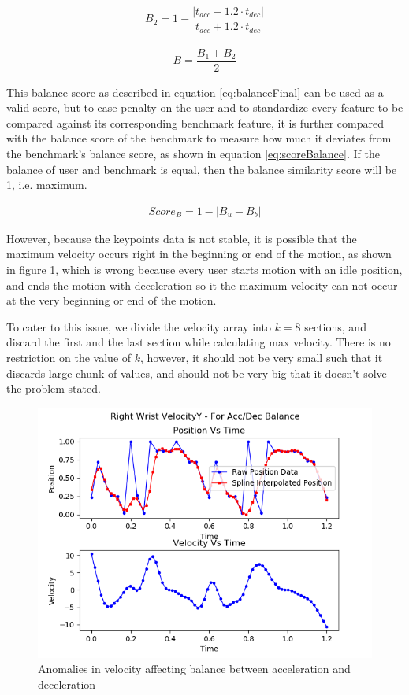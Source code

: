 \begin{gather} 
  B_2 = 1 - \dfrac{|t_{acc} - 1.2 \cdot t_{dec}|}{t_{acc} + 1.2 \cdot t_{dec}}
  \label{eq:balance2}
\end{gather}

\begin{gather} 
  B = \dfrac{B_1 + B_2}{2}
  \label{eq:balanceFinal}
\end{gather}

This balance score as described in equation \ref{eq:balanceFinal} can be used as a valid score, but to ease penalty on the user and to standardize every feature to be compared against its corresponding benchmark feature, it is further compared with the balance score of the benchmark to measure how much it deviates from the benchmark's balance score, as shown in equation \ref{eq:scoreBalance}. If the balance of user and benchmark is equal, then the balance similarity score will be 1, i.e. maximum.

\begin{gather} 
  Score_{B} = 1 - |B_u - B_b|
  \label{eq:scoreBalance}
\end{gather}

However, because the keypoints data is not stable, it is possible that the maximum velocity occurs right in the beginning or end of the motion, as shown in figure \ref{fig:accDectimes_maxAtStart}, which is wrong because every user starts motion with an idle position, and ends the motion with deceleration so it the maximum velocity can not occur at the very beginning or end of the motion.

To cater to this issue, we divide the velocity array into $k = 8$ sections, and discard the first and the last section while calculating max velocity. There is no restriction on the value of $k$, however, it should not be very small such that it discards large chunk of values, and should not be very big that it doesn't solve the problem stated. 

\begin{figure}
  \centering
  \includegraphics[scale=0.8]{images/graphs/accDecPhase_Video5_good_RWrist_MaxAtStart.png}
  \caption{Anomalies in velocity affecting balance between acceleration and deceleration}
  \label{fig:accDectimes_maxAtStart}
\end{figure}

